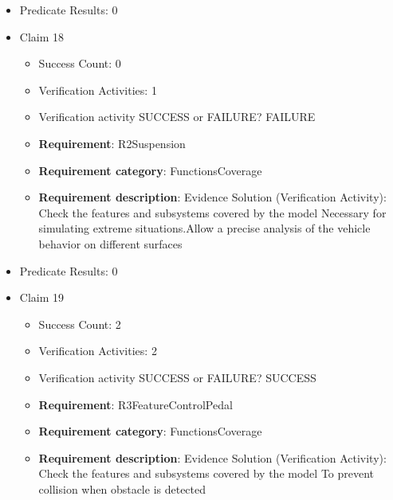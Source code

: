 \documentclass{article}
\begin{document}
\begin{itemize}
\begin{itemize}
						\item \textbf{Requirement}: R1RealisticSimu 
						\item \textbf{Requirement category}: FunctionsCoverage 
						\item \textbf{Requirement description}: Evidence Solution (Verification Activity): Check the features covered by the model, analysis of dynamic response in complex scenarios (e.g., cornering under braking, rapid lane change, uneven road surface)  These phenomena directly influence vehicle stability and braking effectiveness in critical driving scenarios
					
				\end{itemize}
				
									    
				\item Predicate Results: 0

  				  \item Claim 18
				\begin{itemize}
			    	\item Success Count: 0 
			    	\item Verification Activities: 1
					\item Verification activity SUCCESS or FAILURE? FAILURE
		
						\item \textbf{Requirement}: R2Suspension 
						\item \textbf{Requirement category}: FunctionsCoverage 
						\item \textbf{Requirement description}: Evidence Solution (Verification Activity): Check the features and subsystems covered by the model Necessary for simulating extreme situations.Allow a precise analysis of the vehicle behavior on different surfaces
					
				\end{itemize}
				
									    
				\item Predicate Results: 0

  				  \item Claim 19
				\begin{itemize}
			    	\item Success Count: 2 
			    	\item Verification Activities: 2
					\item Verification activity SUCCESS or FAILURE? SUCCESS
		
						\item \textbf{Requirement}: R3FeatureControlPedal 
						\item \textbf{Requirement category}: FunctionsCoverage 
						\item \textbf{Requirement description}: Evidence Solution (Verification Activity): Check the features and subsystems covered by the model  To prevent collision when obstacle is detected
					

\end{itemize}
\end{itemize}
\end{document}
